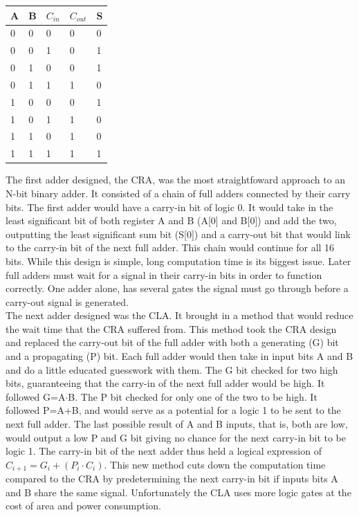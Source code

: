 \documentclass[journal, twocolumn, final,11pt,letterpaper]{IEEEtran}
\begin{document}
\begin{center}
	\begin{tabular}{lll|ll}
		A & B &$C_{in}$& $C_{out}$& S \\ \hline
		0 & 0 & 0      & 0 & 0\\
		0 & 0 & 1      & 0 & 1\\
		0 & 1 & 0      & 0 & 1\\
		0 & 1 & 1      & 1 & 0\\
		1 & 0 & 0      & 0 & 1\\
		1 & 0 & 1      & 1 & 0\\
		1 & 1 & 0      & 1 & 0\\
		1 & 1 & 1      & 1 & 1\\		
	\end{tabular}
	\label{FAtruth}
\end{center}

The first adder designed, the CRA,  was the most straightfoward approach to an N-bit binary adder.  It consisted of a chain of full adders connected by their carry bits. The first adder would have a carry-in bit of logic 0.  It would take in the least significant bit of both register A and B (A[0] and B[0]) and add the two, outputting the least significant sum bit (S[0]) and a carry-out bit that would link to the carry-in bit of the next full adder.  This chain would continue for all 16 bits.  While this design is simple, long computation time is its biggest issue.  Later full adders must wait for a signal in their carry-in bits in order to function correctly.  One adder alone, has several gates the signal must go through before a carry-out signal is generated.  \\

The next adder designed was the CLA.  It brought in a method that would reduce the wait time that the CRA suffered from.  This method took the CRA design and replaced the carry-out bit of the full adder with both a generating (G) bit and a propagating (P) bit.  Each full adder would then take in input bits A and B and do a little educated guesswork with them.  The G bit checked for two high bits, guaranteeing that the carry-in of the next full adder would be high.  It followed G=A$\cdot$B.  The P bit checked for only one of the two to be high.  It followed P=A+B, and would serve as a potential for a logic 1 to be sent to the next full adder.  The last possible result of A and B inputs, that is, both are low, would output a low P and G bit giving no chance for the next carry-in bit to be logic 1.  The carry-in bit of the next adder thus held a logical expression of $C_{i+1}=G_i+(P_i\cdot C_i)$.  This new method cuts down the computation time compared to the CRA by predetermining the next carry-in bit if inputs bits A and B share the same signal.  Unfortunately the CLA uses more logic gates at the cost of area and power consumption.  \\
\end{document}
